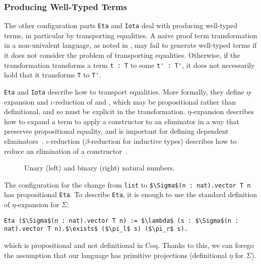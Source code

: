 \subsubsection{Producing Well-Typed Terms}
\label{sec:equality}

The other configuration parts \lstinline{Eta} and \lstinline{Iota} deal with producing well-typed terms,
in particular by transporting equalities.
A naive proof term transformation in a non-univalent language, as noted in \citet{tabareau2019marriage},
may fail to generate well-typed terms if it does not consider the problem of transporting equalities.
Otherwise, if the transformation transforms a term \lstinline{t : T} to some \lstinline{t' : T'}, it does not necessarily
hold that it transforms \lstinline{T} to \lstinline{T'}.

\lstinline{Eta} and \lstinline{Iota} describe how to transport equalities.
More formally, they define $\eta$-expansion and $\iota$-reduction of \A and \B,
which may be propositional rather than definitional, and so must be explicit in the transformation.
$\eta$-expansion describes how to expand a term to apply a constructor to an eliminator in a way that preserves propositional equality,
and is important for defining dependent eliminators~\cite{nlab:eta-conversion}.
$\iota$-reduction ($\beta$-reduction for inductive types) describes how to reduce an elimination of a constructor~\cite{nlab:beta-reduction}.

\begin{figure}
\begin{minipage}{0.48\textwidth}
   
\end{minipage}
\hfill
\begin{minipage}{0.48\textwidth}
   
\end{minipage}
\vspace{-0.3cm}
\caption{Unary (left) and binary (right) natural numbers.}
\label{fig:nattobin}
\end{figure}

The configuration for the change from \lstinline{list} to \lstinline{$\Sigma$(n : nat).vector T n} has propositional \lstinline{Eta}.
To describe \lstinline{Eta}, it is enough to use the standard definition of $\eta$-expansion for $\Sigma$:

\begin{lstlisting}
Eta ($\Sigma$(n : nat).vector T n) := $\lambda$ (s : $\Sigma$(n : nat).vector T n).$\exists$ ($\pi_l$ s) ($\pi_r$ s).
\end{lstlisting}
which is propositional and not definitional in Coq.
Thanks to this, we can forego the assumption that our language has primitive projections (definitional $\eta$ for $\Sigma$).

